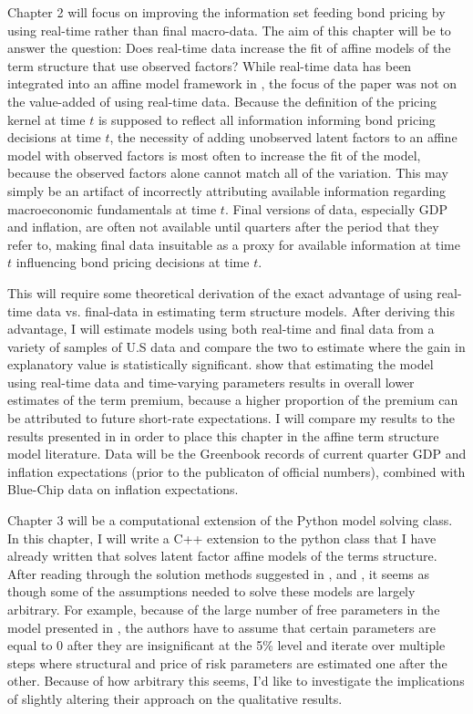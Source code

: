 \documentclass{article}
\numberwithin{equation}{section}
\begin{document}
Chapter 2 will focus on improving the information set feeding bond pricing by
using real-time rather than final macro-data. The aim of this chapter will be
to answer the question: Does real-time data increase the fit of affine models
of the term structure that use observed factors? While real-time data has been
integrated into an affine model framework in \citet{orphanideswei2010}, the
focus of the paper was not on the value-added of using real-time data. Because
the definition of the pricing kernel at time $t$ is supposed to reflect all
information informing bond pricing decisions at time $t$, the necessity of
adding unobserved latent factors to an affine model with observed factors is
most often to increase the fit of the model, because the observed factors alone
cannot match all of the variation. This may simply be an artifact of
incorrectly attributing available information regarding macroeconomic
fundamentals at time $t$. Final versions of data, especially GDP and inflation,
are often not available until quarters after the period that they refer to,
making final data insuitable as a proxy for available information at time $t$
influencing bond pricing decisions at time $t$.

This will require some theoretical derivation of the exact advantage of using
real-time data vs. final-data in estimating term structure models. After
deriving this advantage, I will estimate models using both real-time and final
data from a variety of samples of U.S data and compare the two to estimate
where the gain in explanatory value is statistically significant.
\citet{orphanideswei2010} show that estimating the model using real-time data
and time-varying parameters results in overall lower estimates of the term
premium, because a higher proportion of the premium can be attributed to future
short-rate expectations. I will compare my results to the results presented in
\citet{orphanideswei2010} in order to place this chapter in the affine term
structure model literature. Data will be the Greenbook records of current
quarter GDP and inflation expectations (prior to the publicaton of official
numbers), combined with Blue-Chip data on inflation expectations.

Chapter 3 will be a computational extension of the Python model solving class.
In this chapter, I will write a C++ extension to the python class that I have
already written that solves latent factor affine models of the terms structure.
After reading through the solution methods suggested in
\citet{daisingleton2000}, \citet{ang2003no} and \citet{duffee2004estimation},
it seems as though some of the assumptions needed to solve these models are
largely arbitrary. For example, because of the large number of free parameters
in the model presented in \citet{ang2003no}, the authors have to assume that
certain parameters are equal to 0 after they are insignificant at the 5\% level
and iterate over multiple steps where structural and price of risk parameters
are estimated one after the other. Because of how arbitrary this seems, I'd
like to investigate the implications of slightly altering their approach on the
qualitative results.
\end{document}
